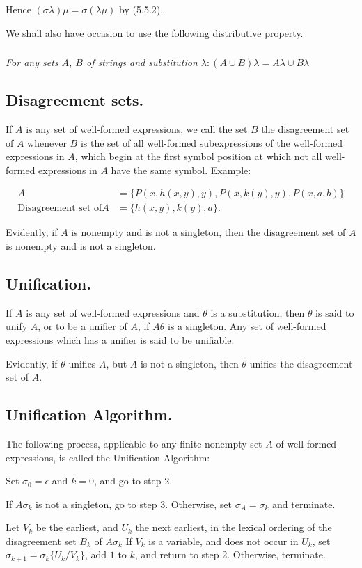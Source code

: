 \documentclass[8pt]{extarticle}
\begin{document}
\noindent Hence $(\sigma\lambda)\mu = \sigma(\lambda\mu)$ by (5.5.2).

We shall also have occasion to use the following distributive property. 
\subsubsection{}
\emph{For any sets $A$, $B$ of strings and substitution $\lambda: (A \cup B)\lambda = A\lambda\cup B\lambda$}

\subsection{Disagreement sets.}

If $A$ is any set of well-formed expressions, we call the
set $B$ the disagreement set of $A$ whenever $B$ is the set of all well-formed subexpressions of the well-formed expressions in $A$, which begin at the first symbol position at which not all well-formed expressions in $A$ have the same symbol.
\noindent Example:

\begin{align*}
                           A &= \{P(x,h(x,y),y),P(x,k(y),y), P(x,a,b)\}\\
\text{Disagreement set of} A &= \{h(x,y), k(y), a\}.
\end{align*}

Evidently, if $A$ is nonempty and is not a singleton, then the disagreement set
of $A$ is nonempty and is not a singleton. 

\subsection{Unification.}
If $A$ is any set of well-formed expressions and $\theta$ is a substitution, then $\theta$ is said to unify $A$, or to be a unifier of $A$, if $A\theta$ is a singleton. Any set of well-formed expressions which has a unifier is said to be unifiable. 

Evidently, if $\theta$ unifies $A$, but $A$ is not a singleton, then $\theta$ unifies the disagreement set of $A$.

\subsection{Unification Algorithm.}
The following process, applicable to any finite
nonempty set $A$ of well-formed expressions, is called the Unification Algorithm:

\begin{steps}
    \item Set $\sigma_0 = \epsilon$ and $k = 0$, and go to step 2.
    \item If $A\sigma_k$ is not a singleton, go to step 3. Otherwise, set $\sigma_A = \sigma_k$ and terminate.
    \item Let $V_k$ be the earliest, and $U_k$ the next earliest, in the lexical ordering of the disagreement set $B_k$ of $A\sigma_k$ If $V_k$ is a variable, and does not occur in $U_k$, set $\sigma_{k+1} = \sigma_k\{U_k/V_k\}$, add $1$ to $k$, and return to step 2. Otherwise, terminate.
\end{steps}
\end{document}
